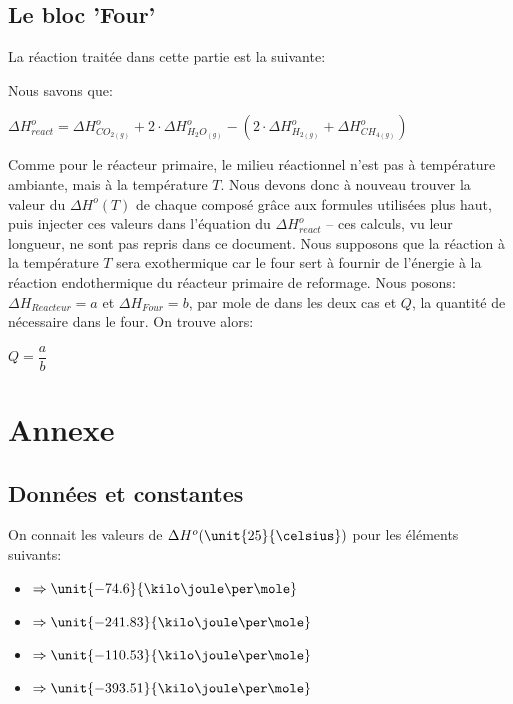 \documentclass[11pt,a4paper]{report}
\begin{document}
\subsection*{Le bloc 'Four'}
La réaction traitée dans cette partie est la suivante:


Nous savons que:

$\Delta H^o_{react} = \Delta H^o_{CO_{2(g)}} + 2\cdot \Delta H^o_{H_{2}O_{(g)}} - \left(2\cdot \Delta H^o_{H_{2(g)}} +
\Delta H^o_{CH_{4(g)}}\right)$

Comme pour le réacteur primaire, le milieu réactionnel n'est pas à température ambiante, mais à la température $T$. 
Nous devons donc à nouveau trouver la valeur du $\Delta H^o(T)$ de chaque composé grâce aux formules utilisées plus haut,
puis injecter ces valeurs dans l'équation du $\Delta H^o_{react}$ -- ces calculs, vu leur longueur, ne sont pas repris dans
ce document.
Nous supposons que la réaction à la température $T$ sera exothermique car le four sert à fournir de l'énergie à la réaction
endothermique du réacteur primaire de reformage.
Nous posons: $\Delta H_{Reacteur} = a$ et $\Delta H_{Four} = b$, par mole de  dans les deux cas et $Q$, la quantité 
de  nécessaire dans le four.
On trouve alors:

$Q = \dfrac{a}{b}$



\section*{Annexe}
\subsection*{Données et constantes}
On connait les valeurs de $\Delta H^o (\unit{25}{\celsius})$ pour les éléments suivants:

\begin{itemize}
\item{ $\Rightarrow \unit{-74.6}{\kilo\joule\per\mole}$}
\item{ $\Rightarrow \unit{-241.83}{\kilo\joule\per\mole}$}
\item{ $\Rightarrow \unit{-110.53}{\kilo\joule\per\mole}$}
\item{ $\Rightarrow \unit{-393.51}{\kilo\joule\per\mole}$}
\end{itemize}
\end{document}
